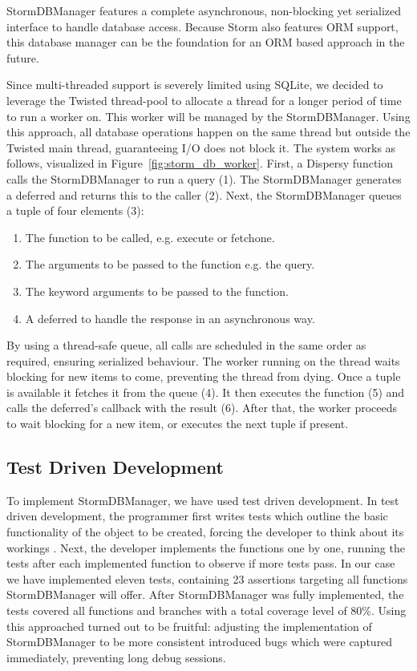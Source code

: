StormDBManager features a complete asynchronous, non-blocking yet serialized interface to handle database access.
Because Storm also features ORM support, this database manager can be the foundation for an ORM based approach in the future.

Since multi-threaded support is severely limited using SQLite, we decided to leverage the Twisted thread-pool to allocate a thread for a longer period of time to run a worker on.
This worker will be managed by the StormDBManager.
Using this approach, all database operations happen on the same thread but outside the Twisted main thread, guaranteeing I/O does not block it.
The system works as follows, visualized in Figure~\ref{fig:storm_db_worker}.
First, a Dispersy function calls the StormDBManager to run a query (1).
The StormDBManager generates a deferred and returns this to the caller (2).
Next, the StormDBManager queues a tuple of four elements (3):

\begin{enumerate}
	\item The function to be called, e.g. execute or fetchone.
	\item The arguments to be passed to the function e.g. the query.
	\item The keyword arguments to be passed to the function.
	\item A deferred to handle the response in an asynchronous way.
\end{enumerate}

By using a thread-safe queue, all calls are scheduled in the same order as required, ensuring serialized behaviour.
The worker running on the thread waits blocking for new items to come, preventing the thread from dying.
Once a tuple is available it fetches it from the queue (4).
It then executes the function (5) and calls the deferred's callback with the result (6).
After that, the worker proceeds to wait blocking for a new item, or executes the next tuple if present.

\subsection{Test Driven Development}
To implement StormDBManager, we have used test driven development.
In test driven development, the programmer first writes tests which outline the basic functionality of the object to be created, forcing the developer to think about its workings \cite{janzen2005test}.
Next, the developer implements the functions one by one, running the tests after each implemented function to observe if more tests pass.
In our case we have implemented eleven tests, containing 23 assertions targeting all functions StormDBManager will offer.
After StormDBManager was fully implemented, the tests covered all functions and branches with a total coverage level of 80\%.
Using this approached turned out to be fruitful: adjusting the implementation of StormDBManager to be more consistent introduced bugs which were captured immediately, preventing long debug sessions.

